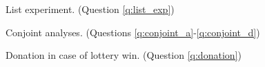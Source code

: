 \begin{figure}[h!]
    \caption{List experiment. (Question \ref{q:list_exp})}\label{fig:list_exp}
\end{figure}

\begin{figure}[h!]
    \caption{Conjoint analyses. (Questions \ref{q:conjoint_a}-\ref{q:conjoint_d})}\label{fig:conjoint}
\end{figure}


\begin{figure}[h!]
    \caption{Donation in case of lottery win. (Question \ref{q:donation})}\label{fig:donation}
\end{figure}

